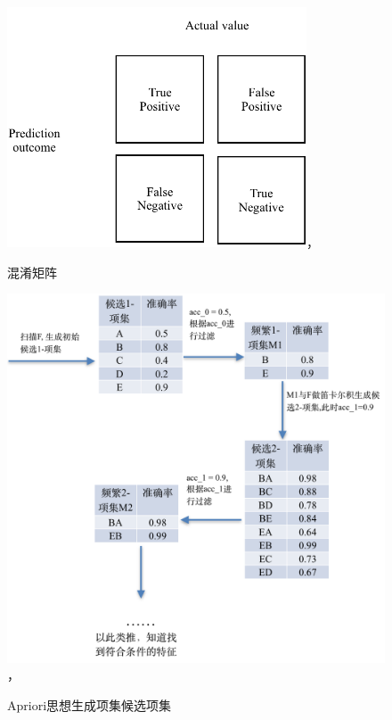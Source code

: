 \documentclass{njubachelor}
\begin{document}
\begin{figure}[!ht]
  \centering
  \includegraphics[width=3.5in]{pic/fig1}， 
  \caption{混淆矩阵}
\end{figure}

\begin{figure}[!ht]
    \centering
    \includegraphics[width=5.5in]{pic/fig2}， 
    \caption{Apriori思想生成项集候选项集}
\end{figure}
\end{document}
